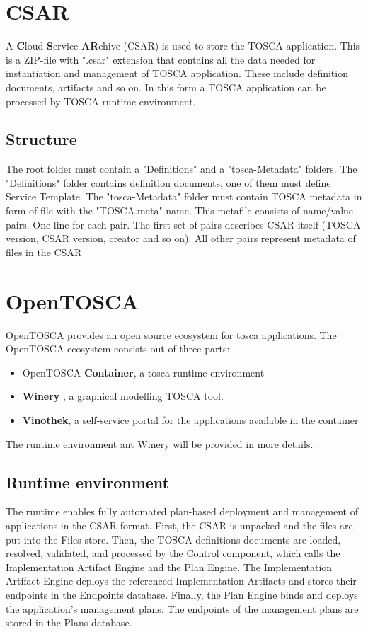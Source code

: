 \section{CSAR} \label{sec:csar}
A \textbf{C}loud \textbf{S}ervice \textbf{AR}chive (CSAR) is used to store the TOSCA application.
This is a ZIP-file with ".csar" extension that contains all the data needed for instantiation and management of TOSCA application.
These include definition documents, artifacts and so on.
In this form a TOSCA application can be processed by TOSCA runtime environment.
\subsection*{Structure}
The root folder must contain a "Definitions" and a "\gls{tosca}-Metadata" folders.
The "Definitions" folder contains definition documents, one of them must define Service Template.
The "\gls{tosca}-Metadata" folder must contain TOSCA metadata in form of file with the "TOSCA.meta" name.
This metafile consists of name/value pairs. 
One line for each pair. 
The first set of pairs describes CSAR itself (TOSCA version, CSAR version, creator and so on). 
All other pairs represent metadata of files in the CSAR

\section{OpenTOSCA} \label{sec:opentosca}
OpenTOSCA provides an open source ecosystem for \gls{tosca} applications. 
The OpenTOSCA ecosystem consists out of three parts: \cite*{OpenTOSCA}
\begin{itemize}
	\item OpenTOSCA \textbf{Container}, a \gls{tosca} runtime environment
	\item \textbf{Winery} \label{tool:winery}, a graphical modelling TOSCA tool.
	\item \textbf{Vinothek}, a self-service portal for the applications available in the container
\end{itemize}
The runtime environment ant Winery will be provided in more details. 
\subsection*{Runtime environment}
The runtime enables fully automated plan-based deployment and management of applications in the CSAR format. 
First, the CSAR is unpacked and the files are put into the Files store.
Then, the TOSCA definitions documents are loaded, resolved, validated, and processed by the Control component, which calls the Implementation Artifact Engine and the Plan Engine.
The Implementation Artifact Engine deploys the referenced Implementation Artifacts and stores their endpoints in the Endpoints database. 
Finally, the Plan Engine binds and deploys the application’s management plans.
The endpoints of the management plans are stored in the Plans database.
\cite{INPROC-2013-45}
